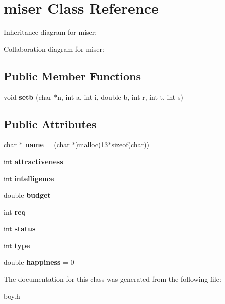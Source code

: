 \hypertarget{classmiser}{}\section{miser Class Reference}
\label{classmiser}


Inheritance diagram for miser\+:


Collaboration diagram for miser\+:
\subsection*{Public Member Functions}
\begin{DoxyCompactItemize}
\item 
void {\bfseries setb} (char $\ast$n, int a, int i, double b, int r, int t, int s)\hypertarget{classmiser_a23530aff8d852ed057a1ad98268493a8}{}\label{classmiser_a23530aff8d852ed057a1ad98268493a8}

\end{DoxyCompactItemize}
\subsection*{Public Attributes}
\begin{DoxyCompactItemize}
\item 
char $\ast$ {\bfseries name} = (char $\ast$)malloc(13$\ast$sizeof(char))\hypertarget{classmiser_ac6d714b9e3fc29364b518fd4fe2f1e06}{}\label{classmiser_ac6d714b9e3fc29364b518fd4fe2f1e06}

\item 
int {\bfseries attractiveness}\hypertarget{classmiser_aed6043472775af232c59a943b9792e1a}{}\label{classmiser_aed6043472775af232c59a943b9792e1a}

\item 
int {\bfseries intelligence}\hypertarget{classmiser_ad929ce5d5c9f8aa5e521a52dc0b4fe17}{}\label{classmiser_ad929ce5d5c9f8aa5e521a52dc0b4fe17}

\item 
double {\bfseries budget}\hypertarget{classmiser_aa1bc3bd15db8d0b267de007e6ee8171c}{}\label{classmiser_aa1bc3bd15db8d0b267de007e6ee8171c}

\item 
int {\bfseries req}\hypertarget{classmiser_af08433dea78facb328043248dc9b2858}{}\label{classmiser_af08433dea78facb328043248dc9b2858}

\item 
int {\bfseries status}\hypertarget{classmiser_ad62c1b8d0c2cb7f257b0d06244de6939}{}\label{classmiser_ad62c1b8d0c2cb7f257b0d06244de6939}

\item 
int {\bfseries type}\hypertarget{classmiser_ae684bfae6a95b11e612439307c44c1ba}{}\label{classmiser_ae684bfae6a95b11e612439307c44c1ba}

\item 
double {\bfseries happiness} = 0\hypertarget{classmiser_a88eb54c6bda32412eff9d069f4066943}{}\label{classmiser_a88eb54c6bda32412eff9d069f4066943}

\end{DoxyCompactItemize}


The documentation for this class was generated from the following file\+:\begin{DoxyCompactItemize}
\item 
boy.\+h\end{DoxyCompactItemize}
